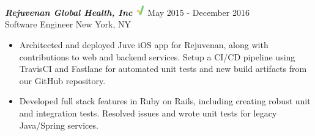 {\sl \textbf{Rejuvenan Global Health, Inc} \includegraphics[width=0.4cm]{./images/rejuvenan.jpg}} \hfill May 2015 - December 2016 \\
Software Engineer \hfill New York, NY
\begin{itemize}
\item Architected and deployed Juve iOS app for Rejuvenan, along with contributions to web and backend services. Setup a CI/CD pipeline using TravisCI and Fastlane for automated unit tests and new build artifacts from our GitHub repository.
\item Developed full stack features in Ruby on Rails, including creating robust unit and integration tests. Resolved issues and wrote unit tests for legacy Java/Spring services.
\end{itemize}
